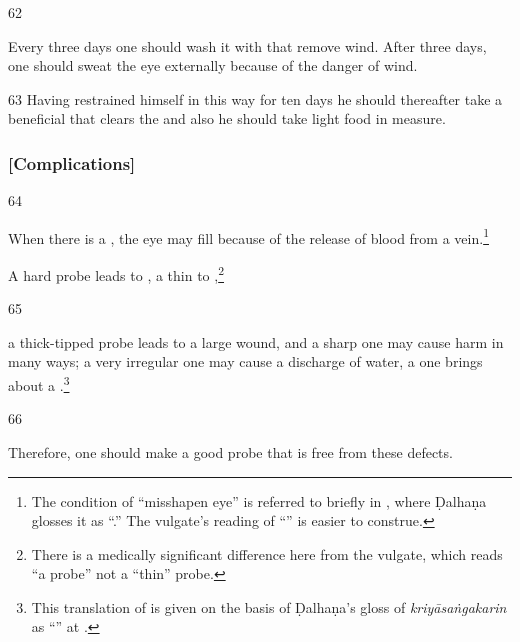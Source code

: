 \begin{translation}
    
    \item[62]
    
    Every three days one should wash it with 
     that remove wind.
    After three days, one should sweat the eye externally because of the danger of wind. 
    
    \item[63]
    Having restrained himself in this way for ten days he should thereafter take a beneficial 
     that clears the  and also he should take light food 
    in 
    measure.
    
\end{translation}

\subsubsection{[Complications]}

\begin{translation}
    
    \item[64] 
    
    When there is a , the eye may fill because of the
    release of blood from a vein.\footnote{The condition of “misshapen eye” is referred
    to briefly in , where Ḍalhaṇa glosses it as
    “.”  The vulgate's reading of “” is easier to construe.}
    
    
    A hard probe leads to , a thin to
    ,\footnote{There is a medically
    significant difference here from the vulgate, which reads “a 
    probe” not a “thin” probe.}
    
    \item[65]
    
    a thick-tipped probe leads to a large wound, and a sharp one may cause harm in many 
    ways;
    a very irregular one may cause a discharge of water, a  one brings about 
    a .\footnote{This translation of  is given on the basis of Ḍalhaṇa's gloss of \emph{kriyāsaṅgakarin} 
    as “”
    at .}
    
    \item[66]
    
    Therefore, one should make a good probe that is free from these defects.
    
\end{translation}

